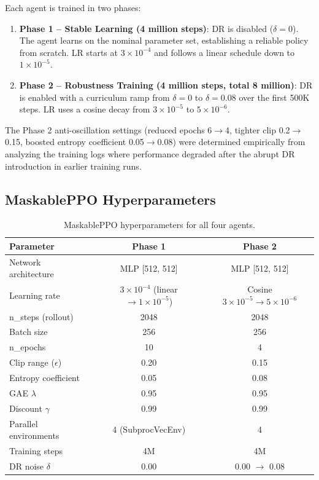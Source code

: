 Each agent is trained in two phases:
\begin{enumerate}
    \item \textbf{Phase 1 -- Stable Learning (4 million steps)}: DR is disabled ($\delta = 0$). The agent learns on the nominal parameter set, establishing a reliable policy from scratch. LR starts at $3\times10^{-4}$ and follows a linear schedule down to $1\times10^{-5}$.
    \item \textbf{Phase 2 -- Robustness Training (4 million steps, total 8 million)}: DR is enabled with a curriculum ramp from $\delta=0$ to $\delta=0.08$ over the first 500K steps. LR uses a cosine decay from $3\times10^{-5}$ to $5\times10^{-6}$.
\end{enumerate}
The Phase 2 anti-oscillation settings (reduced epochs 6$\to$4, tighter clip 0.2$\to$0.15, boosted entropy coefficient 0.05$\to$0.08) were determined empirically from analyzing the training logs where performance degraded after the abrupt DR introduction in earlier training runs.

\subsection{MaskablePPO Hyperparameters}

\begin{table}[H]
    \centering
    \caption{MaskablePPO hyperparameters for all four agents.}
    \label{tab:ppo_params}
    \begin{tabular}{lcc}
        \toprule
        \textbf{Parameter} & \textbf{Phase 1} & \textbf{Phase 2} \\
        \midrule
        Network architecture  & MLP [512, 512] & MLP [512, 512] \\
        Learning rate         & $3\times10^{-4}$ (linear $\to 1\times10^{-5}$) & Cosine $3\times10^{-5} \to 5\times10^{-6}$ \\
        n\_steps (rollout)    & 2048  & 2048 \\
        Batch size            & 256   & 256 \\
        n\_epochs             & 10    & 4 \\
        Clip range ($\epsilon$) & 0.20 & 0.15 \\
        Entropy coefficient   & 0.05  & 0.08 \\
        GAE $\lambda$         & 0.95  & 0.95 \\
        Discount $\gamma$     & 0.99  & 0.99 \\
        Parallel environments & 4 (SubprocVecEnv) & 4 \\
        Training steps        & 4M    & 4M \\
        DR noise $\delta$     & 0.00  & 0.00 $\to$ 0.08 \\
        \bottomrule
    \end{tabular}
\end{table}

